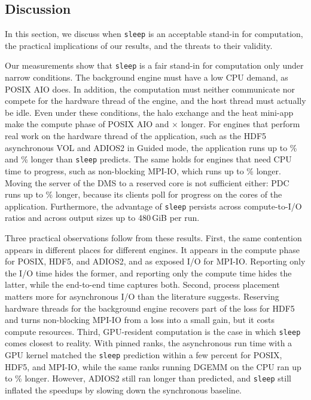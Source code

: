 \subsection{Discussion}
\label{sec:discussion}
In this section, we discuss when \texttt{sleep} is an acceptable stand-in for
computation, the practical implications of our results, and the threats to
their validity.

Our measurements show that \texttt{sleep} is a fair stand-in for computation
only under narrow conditions. The background engine must have a low CPU
demand, as POSIX AIO does. In addition, the computation must neither
communicate nor compete for the hardware thread of the engine, and the host
thread must actually be idle. Even under these conditions, the halo exchange
and the heat mini-app make the compute phase of POSIX AIO \SlowPosixHalo and
\SlowPosixHeat$\times$ longer. For engines that perform real work on the
hardware thread of the application, such as the HDF5 asynchronous VOL and
ADIOS2 in Guided mode, the application runs up to \ExcmaxpctHdf\% and
\ExcmaxpctAdios\% longer than \texttt{sleep} predicts. The same holds for
engines that need CPU time to progress, such as non-blocking MPI-IO, which
runs up to \ExcmaxpctMpiio\% longer. Moving the server of the DMS to a
reserved core is not sufficient either: PDC runs up to \ExcmaxpctPdc\%
longer, because its clients poll for progress on the cores of the
application. Furthermore, the advantage of
\texttt{sleep} persists across compute-to-I/O ratios and across output
sizes up to 480\,GiB per run.

Three practical observations follow from these results. First, the same
contention appears in different places for different engines. It appears in
the compute phase for POSIX, HDF5, and ADIOS2, and as exposed I/O for MPI-IO.
Reporting only the I/O time hides the former, and reporting only the compute
time hides the latter, while the end-to-end time captures both. Second,
process placement matters more for asynchronous I/O than the literature
suggests. Reserving hardware threads for the background engine recovers part
of the loss for HDF5 and turns non-blocking MPI-IO from a loss into a small
gain, but it costs compute resources. Third, GPU-resident computation is the
case in which \texttt{sleep} comes closest to reality. With pinned ranks, the
asynchronous run time with a GPU kernel matched the \texttt{sleep}
prediction within a few percent for POSIX, HDF5, and MPI-IO, while the same
ranks running DGEMM on the CPU ran up to \GpuexcpctHdfDgemm\% longer.
However, ADIOS2 still ran longer than predicted, and \texttt{sleep} still
inflated the speedups by slowing down the synchronous baseline.

